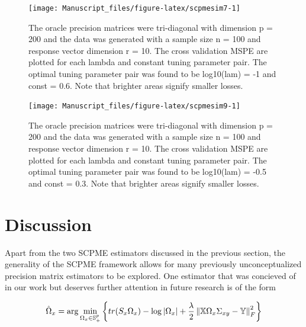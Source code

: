 \documentclass[11pt,]{report}
\theoremstyle{definition}
\theoremstyle{definition}
\theoremstyle{definition}
\theoremstyle{remark}
\begin{document}
\vspace{0.5cm}

\vspace{0.5cm}
\begin{figure}

{\centering \texttt{[image: Manuscript\_files/figure-latex/scpmesim7-1]} 

}

\caption{The oracle precision matrices were tri-diagonal with dimension p = 200 and the data was generated with a sample size n = 100 and response vector dimension r = 10. The cross validation MSPE are plotted for each lambda and constant tuning parameter pair. The optimal tuning parameter pair was found to be log10(lam) = -1 and const = 0.6. Note that brighter areas signify smaller losses.}\label{fig:scpmesim7}
\end{figure}
\vspace{0.5cm}

\vspace{0.5cm}
\begin{figure}

{\centering \texttt{[image: Manuscript\_files/figure-latex/scpmesim9-1]} 

}

\caption{The oracle precision matrices were tri-diagonal with dimension p = 200 and the data was generated with a sample size n = 100 and response vector dimension r = 10. The cross validation MSPE are plotted for each lambda and constant tuning parameter pair. The optimal tuning parameter pair was found to be log10(lam) = -0.5 and const = 0.3. Note that brighter areas signify smaller losses.}\label{fig:scpmesim9}
\end{figure}
\vspace{0.5cm}

\newpage

\hypertarget{discussion}{%
\section{Discussion}\label{discussion}}

Apart from the two SCPME estimators discussed in the previous section, the generality of the SCPME framework allows for many previously unconceptualized precision matrix estimators to be explored. One estimator that was concieved of in our work but deserves further attention in future research is of the form

\begin{equation}
\hat{\Omega}_{x} = \arg\min_{\Omega_{x} \in \mathbb{S}_{+}^{p}}\left\{ tr(S_{x}\Omega_{x}) - \log\left| \Omega_{x} \right| + \frac{\lambda}{2}\left\| \mathbb{X}\Omega_{x} \Sigma_{xy} - \mathbb{Y} \right\|_{F}^{2} \right\}
\label{eq:penregression}\notag
\end{equation}
\end{document}
